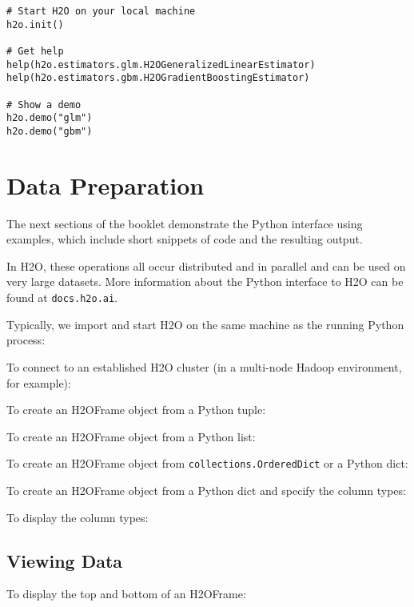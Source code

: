 {\begin{lstlisting}[style=pythoncode]
# Start H2O on your local machine
h2o.init()

# Get help
help(h2o.estimators.glm.H2OGeneralizedLinearEstimator)
help(h2o.estimators.gbm.H2OGradientBoostingEstimator)

# Show a demo
h2o.demo("glm")
h2o.demo("gbm")
\end{lstlisting}


\section{Data Preparation}
The next sections of the booklet demonstrate the Python interface using examples, which include  short snippets of code and the
resulting output.  

In H2O, these operations all occur distributed and in
parallel and can be used on very large datasets.  More information about the
Python interface to H2O can be found at {\texttt{docs.h2o.ai}}.

Typically, we import and start H2O on the same machine as the running Python process:


To connect to an established H2O cluster (in a multi-node Hadoop environment, for example):


To create an H2OFrame object from a Python tuple:


To create an H2OFrame object from a Python list:


To create an H2OFrame object from \texttt{collections.OrderedDict} or a Python dict:


To create an H2OFrame object from a Python dict and specify the column types:


To display the column types:


\subsection{Viewing Data}
To display the top and bottom of an H2OFrame:


}
